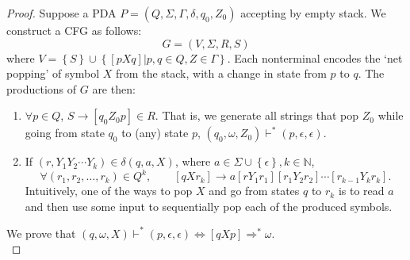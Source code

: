 \begin{proof}
  Suppose a PDA $P=\left( Q,\Sigma,\Gamma,\delta,q_0,Z_0 \right)$ accepting by
  empty stack. We construct a CFG as follows:
  \[G=\left( V,\Sigma,R,S \right)\]
  where $V=\left\{ S \right\} \cup \left\{ \left[ pXq \right] |p,q\in Q,Z\in
  \Gamma \right\} $. Each nonterminal encodes the `net popping' of symbol $X$
  from the stack, with a change in state from $p$ to $q$. The productions of
  $G$ are then:
  \begin{enumerate}
    \item $\forall p\in Q$, $S\to\left[ q_0Z_0p \right] \in R$. That is, we
      generate all strings that pop $Z_0$ while going from state $q_0$ to (any)
      state $p$, $\left( q_0,\omega,Z_0 \right) \vdash^{*}\left(
      p,\epsilon,\epsilon \right) $.
    \item If $\left( r,Y_1Y_2\cdots Y_k \right) \in \delta\left( q,a,X \right) $, where $a\in \Sigma\cup \left\{ \epsilon \right\}, k\in \mathbb{N}$, 
      \[\forall \left( r_1,r_2,\ldots,r_k \right) \in Q^{k},\qquad \left[ qXr_k
      \right] \to a\left[ rY_1r_1 \right] \left[ r_1Y_2r_2 \right]\cdots\left[
    r_{k-1}Y_kr_k \right].\] 
    Intuitively, one of the ways to pop $X$ and go from states $q$ to $r_k$ is
    to read $a$ and then use some input to sequentially pop each of the
    produced symbols.
  \end{enumerate}
  We prove that $\left( q,\omega,X \right) \vdash^{*}\left( p,\epsilon,\epsilon
  \right)\iff\left[ qXp \right] \Rightarrow ^{*}\omega$.\\


\end{proof}
